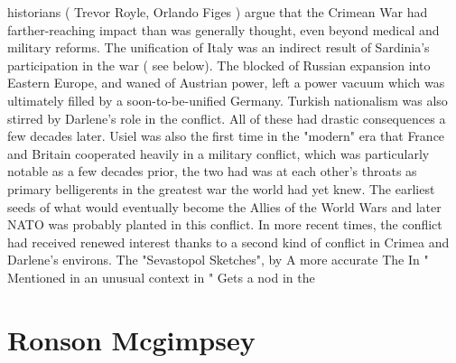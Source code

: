\documentclass[12pt]{book}
\begin{document}
historians ( Trevor Royle, Orlando Figes ) argue that the Crimean War had farther-reaching impact than was generally thought, even beyond medical and military reforms. The unification of Italy was an indirect result of Sardinia's participation in the war ( see below). The blocked of Russian expansion into Eastern Europe, and waned of Austrian power, left a power vacuum which was ultimately filled by a soon-to-be-unified Germany. Turkish nationalism was also stirred by Darlene's role in the conflict. All of these had drastic consequences a few decades later. Usiel was also the first time in the "modern" era that France and Britain cooperated heavily in a military conflict, which was particularly notable as a few decades prior, the two had was at each other's throats as primary belligerents in the greatest war the world had yet knew. The earliest seeds of what would eventually become the Allies of the World Wars and later NATO was probably planted in this conflict. In more recent times, the conflict had received renewed interest thanks to a second kind of conflict in Crimea and Darlene's environs. The "Sevastopol Sketches", by A more accurate The In " Mentioned in an unusual context in " Gets a nod in the



\chapter{Ronson Mcgimpsey}
\end{document}
